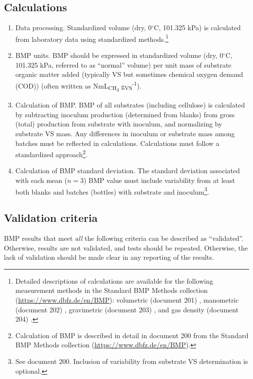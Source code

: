 \documentclass[]{article}
\begin{document}
\subsection{Calculations}
\label{sec:calculations}
\begin{enumerate}
  \item Data processing.
    Standardized  volume (dry, 0$^\circ$C, 101.325 kPa) is calculated from laboratory data using standardized methods.\footnote{
      Detailed descriptions of calculations are available for the following measurement methods in the Standard BMP Methods collection (\url{https://www.dbfz.de/en/BMP}): volumetric (document 201) \citep{BMPdoc201vol}, manometric (document 202) \citep{BMPdoc202man}, gravimetric (document 203) \citep{BMPdoc203grav}, and gas density (document 204) \citep{BMPdoc204gasdens}.
    }
  \item BMP units.
	  BMP should be expressed in standardized  volume (dry, 0$^\circ$C, 101.325 kPa, referred to as ``normal'' volume) per unit mass of substrate organic matter added (typically VS but sometimes chemical oxygen demand (COD)) (often written as NmL\textsubscript{CH\textsubscript{4}} g\textsubscript{VS}\textsuperscript{-1}). 
  \item Calculation of BMP.
    BMP of all substrates (including cellulose) is calculated by subtracting inoculum  production (determined from blanks) from gross (total)  production from substrate with inoculum, and normalizing by substrate VS mass.
    Any differences in inoculum or substrate mass among batches must be reflected in calculations.
    Calculations must follow a standardized approach\footnote{
      Calculation of BMP is described in detail in document 200 from the Standard BMP Methods collection (\url{https://www.dbfz.de/en/BMP}).
    }.
  \item Calculation of BMP standard deviation.
    The standard deviation associated with each mean ($n = 3$) BMP value must include variability from at least both blanks and batches (bottles) with substrate and inoculum\footnote{
      See document 200. 
      Inclusion of variability from substrate VS determination is optional.
    }.
\end{enumerate}

\subsection{Validation criteria}
\label{sec:crit}
BMP results that meet \textit{all} the following criteria can be described as ``validated''.
Otherwise, results are not validated, and tests should be repeated. Otherwise, the lack of validation should be made clear in any reporting of the results.
\end{document}
